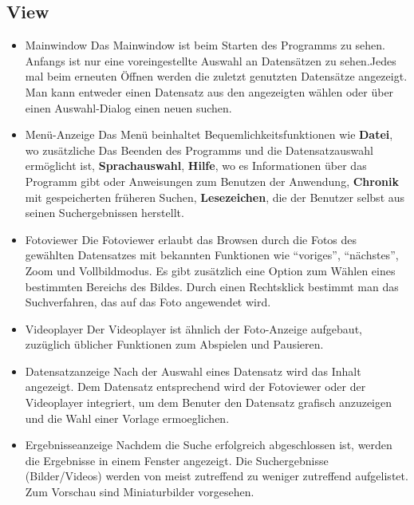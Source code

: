 \subsection{View}
\begin{itemize}
\item Mainwindow \newline
Das Mainwindow ist beim Starten des Programms zu sehen. Anfangs ist nur eine voreingestellte Auswahl an Datensätzen zu sehen.Jedes mal beim erneuten Öffnen werden die zuletzt genutzten Datensätze angezeigt. Man kann entweder einen Datensatz aus den angezeigten wählen oder über einen Auswahl-Dialog einen neuen suchen.
\item Menü-Anzeige \newline
Das Menü beinhaltet Bequemlichkeitsfunktionen wie \textbf{Datei}, wo zusätzliche Das Beenden des Programms und die Datensatzauswahl ermöglicht ist, \textbf{Sprachauswahl}, \textbf{Hilfe}, wo es Informationen über das Programm gibt oder Anweisungen zum Benutzen der Anwendung, \textbf{Chronik} mit gespeicherten früheren Suchen, \textbf{Lesezeichen}, die der Benutzer selbst aus seinen Suchergebnissen herstellt.
\item Fotoviewer \newline
Die Fotoviewer erlaubt das Browsen durch die Fotos des gewählten Datensatzes mit bekannten Funktionen wie \enquote{voriges}, \enquote{nächstes}, Zoom und Vollbildmodus. Es gibt zusätzlich eine Option zum Wählen eines bestimmten Bereichs des Bildes. Durch einen Rechtsklick bestimmt man das Suchverfahren, das auf das Foto angewendet wird.
\item Videoplayer \newline
Der Videoplayer ist ähnlich der Foto-Anzeige aufgebaut, zuzüglich üblicher Funktionen zum Abspielen und Pausieren.
\item Datensatzanzeige \newline
Nach der Auswahl eines Datensatz wird das Inhalt angezeigt. Dem Datensatz entsprechend wird der Fotoviewer oder der Videoplayer integriert, um dem Benuter den Datensatz grafisch anzuzeigen und die Wahl einer Vorlage ermoeglichen.
\item Ergebnisseanzeige \newline
Nachdem die Suche erfolgreich abgeschlossen ist, werden die Ergebnisse in einem Fenster angezeigt. Die Suchergebnisse (Bilder/Videos) werden von meist zutreffend zu weniger zutreffend aufgelistet. Zum Vorschau sind Miniaturbilder vorgesehen.
\end{itemize}
